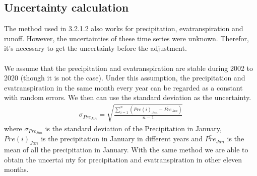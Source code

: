 \subsection{Uncertainty calculation}
The method used in 3.2.1.2 also works for precipitation, evatranspiration and runoff. However, the uncertainties of these time series were unknown. Therefor, it's necessary to get the uncertainty before the adjustment. \\\\
We assume that the precipitation and evatranspiration are stable during 2002 to 2020 (though it is not the case). Under this assumption, the precipitation and evatranspiration in the same month every year can be regarded as a constant with random errors. We then can use the standard deviation as the uncertainty.
\begin{gather}
\sigma_{Pre_{Jan}} = \sqrt{\frac{\sum_{i=1}^{n} (Pre(i)_{Jan} - \bar{Pre}_{Jan})}{n-1}}
\end{gather}
where $\sigma_{Pre_{Jan}}$ is the standard deviation of the Precipitation in January, $Pre(i)_{Jan}$ is the precipitation in January in different years and $\bar{Pre}_{Jan}$ is the mean of all the precipitation in January. With the same method we are able to obtain the uncertai nty for precipitation and evatranspiration in other eleven months. 
